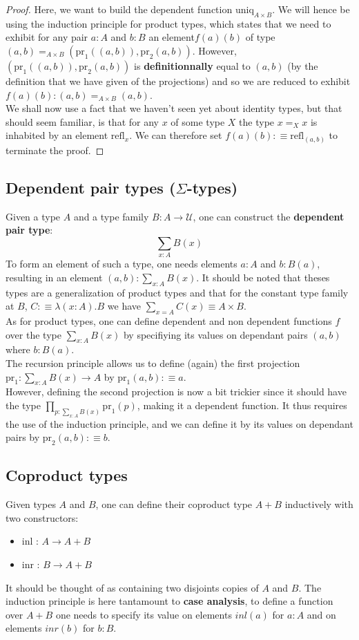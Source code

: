 \documentclass{report}
\begin{document}
\begin{proof}
     Here, we want to build the dependent function $\mathrm{uniq}_{A\times B}$. We will hence be using the induction principle for product types, which states that we need to exhibit for any pair $a : A$ and $b:B$ an element$f(a)(b)$ of type $(a,b)=_{A \times B} (\mathrm{pr}_1((a,b)),\mathrm{pr}_2(a,b))$. However,  $(\mathrm{pr}_1((a,b)),\mathrm{pr}_2(a,b))$ is \textbf{definitionnally} equal to $(a,b)$ (by the definition that we have given of the projections) and so we are reduced to exhibit $f(a)(b) : (a,b)=_{A \times B} (a,b)$.\\ 
     We shall now use a fact that we haven't seen yet about identity types, but that should seem familiar, is that for any $x$ of some type $X$ the type $x=_{X}x$ is inhabited by an element $\mathrm{refl}_x$. We can therefore set $f(a)(b) :\equiv \mathrm{refl}_{(a,b)}$ to terminate the proof.
\end{proof}
\subsection{Dependent pair types ($\Sigma$-types)}
Given a type $A$ and a type family $B : A \rightarrow \mathcal{U}$, one can construct the \textbf{dependent pair type}: 
$$\sum_{x : A} B(x)$$
To form an element of such a type, one needs elements $a : A$ and $b : B(a)$, resulting in an element $(a,b) : \sum_{x : A} B(x)$. It should be noted that theses types are a generalization of product types and that for the constant type family at $B$, $C :\equiv \lambda (x : A).B$ we have $\sum_{x = A} C(x)\equiv A \times B$.\\
As for product types, one can define dependent and non dependent functions $f$ over the type $\sum_{x : A} B(x)$ by specifiying its values on dependant pairs $(a,b)$ where $b:B(a)$.\\ 
The recursion principle allows us to define (again) the first projection $\mathrm{pr}_1 : \sum_{x : A} B(x) \rightarrow A$ by $\mathrm{pr}_1 (a,b) :\equiv a$.\\
However, defining the second projection is now a bit trickier since it should have the type $\prod_{p : \sum_{x : A} B(x)} \mathrm{pr}_1(p)$, making it a dependent function. It thus requires the use of the induction principle, and we can define it by its values on dependant pairs by $\mathrm{pr}_2(a,b) :\equiv b$.
\subsection{Coproduct types}
Given types $A$ and $B$, one can define their coproduct type $A+B$ inductively with two constructors:
\begin{itemize}
  \item inl : $A \rightarrow A+B$
  \item inr : $B \rightarrow A+B$
\end{itemize}
It should be thought of as containing two disjoints copies of $A$ and $B$. The induction principle is here tantamount to \textbf{case analysis}, to define a function over $A+B$ one needs to specify its value on elements $inl(a)$ for $a:A$ and on elements $inr(b)$ for $b:B$. 
\end{document}
